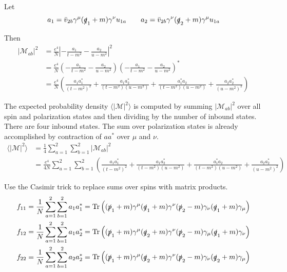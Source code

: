 \documentclass[12pt]{article}
\begin{document}
\noindent
Let
\begin{equation*}
a_1=\bar{v}_{2b}\gamma^\mu(\slashed{q}_1+m)\gamma^\nu u_{1a}
\qquad
a_2=\bar{v}_{2b}\gamma^\nu(\slashed{q}_2+m)\gamma^\mu u_{1a}
\end{equation*}

\noindent
Then
\begin{align*}
|\mathcal{M}_{ab}|^2&=\frac{e^4}{N}\left|-\frac{a_1}{t-m^2}-\frac{a_2}{u-m^2}\right|^2\\
&=
\frac{e^4}{N}
\left(-\frac{a_1}{t-m^2}-\frac{a_2}{u-m^2}\right)
\left(-\frac{a_1}{t-m^2}-\frac{a_2}{u-m^2}\right)^*\\
&=
\frac{e^4}{N}\left(
\frac{a_1a_1^*}{(t-m^2)^2}
+\frac{a_1a_2^*}{(t-m^2)(u-m^2)}
+\frac{a_1^*a_2}{(t-m^2)(u-m^2)}
+\frac{a_2a_2^*}{(u-m^2)^2}
\right)
\end{align*}

\noindent
The expected probability density $\langle|\mathcal{M}|^2\rangle$
is computed by summing $|\mathcal{M}_{ab}|^2$ over all spin and polarization states
and then dividing by the number of inbound states.
There are four inbound states.
The sum over polarization states is already accomplished by contraction
of $aa^*$ over $\mu$ and $\nu$.
\begin{align*}
\langle|\mathcal{M}|^2\rangle
&=\frac{1}{4}\sum_{a=1}^2\sum_{b=1}^2|\mathcal{M}_{ab}|^2\\
&=\frac{e^4}{4N}\sum_{a=1}^2\sum_{b=1}^2
\left(
\frac{a_1a_1^*}{(t-m^2)^2}
+\frac{a_1a_2^*}{(t-m^2)(u-m^2)}
+\frac{a_1^*a_2}{(t-m^2)(u-m^2)}
+\frac{a_2a_2^*}{(u-m^2)^2}
\right)
\end{align*}

\noindent
Use the Casimir trick to replace sums over spins with matrix products.
\begin{align*}
f_{11}&=\frac{1}{N} \sum_{a=1}^2\sum_{b=1}^2 a_1a_1^*=\mathop{\rm Tr}
\left(
(\slashed{p}_1+m)\gamma^\mu(\slashed{q}_1+m)\gamma^\nu(\slashed{p}_2-m)\gamma_\nu(\slashed{q}_1+m)\gamma_\mu
\right)
\\
f_{12}&=\frac{1}{N} \sum_{a=1}^2\sum_{b=1}^2 a_1a_2^*=\mathop{\rm Tr}
\left(
(\slashed{p}_1+m)\gamma^\mu(\slashed{q}_2+m)\gamma^\nu(\slashed{p}_2-m)\gamma_\mu(\slashed{q}_1+m)\gamma_\nu
\right)
\\
f_{22}&=\frac{1}{N} \sum_{a=1}^2\sum_{b=1}^2 a_2a_2^*=\mathop{\rm Tr}
\left(
(\slashed{p}_1+m)\gamma^\mu(\slashed{q}_2+m)\gamma^\nu(\slashed{p}_2-m)\gamma_\nu(\slashed{q}_2+m)\gamma_\mu
\right)
\end{align*}
\end{document}
